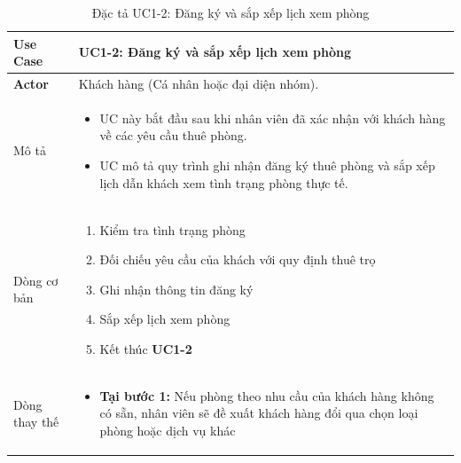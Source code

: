 \vspace{0.5cm}
\begin{table}[H]
    \centering
\begin{tabularx}{\textwidth}{|>{\centering\arraybackslash\bfseries}m{3.5cm}|X|}
    \hline
    Use Case & {\centering\textbf{UC1-2: Đăng ký và sắp xếp lịch xem phòng}\par} \\ 
    \hline
     
    Actor & Khách hàng (Cá nhân hoặc đại diện nhóm). \\
    \hline

    Mô tả & 
    \begin{itemize}[leftmargin=*, nosep, label=-]
        \vspace{0.2cm}
        \item UC này bắt đầu sau khi nhân viên đã xác nhận với khách hàng về các yêu cầu thuê phòng.
        \item UC mô tả quy trình ghi nhận đăng ký thuê phòng và sắp xếp lịch dẫn khách xem tình trạng phòng thực tế.
    \end{itemize} \\ 
    \hline
     
    Dòng cơ bản & 
    \begin{enumerate}[leftmargin=*, nosep]
        \vspace{0.2cm}
        \item Kiểm tra tình trạng phòng
        \item Đối chiếu yêu cầu của khách với quy định thuê trọ
        \item Ghi nhận thông tin đăng ký
        \item Sắp xếp lịch xem phòng
        \item Kết thúc \textbf{UC1-2} 
    \end{enumerate} \\ 
    \hline
     
    Dòng thay thế & 
    \begin{itemize}[leftmargin=*, nosep, label=-]
        \vspace{0.2cm}
        \item \textbf{Tại bước 1:} Nếu phòng theo nhu cầu của khách hàng không có sẵn, nhân viên sẽ đề xuất khách hàng đổi qua chọn loại phòng hoặc dịch vụ khác
    \end{itemize} \\ 
    \hline
\end{tabularx}
\caption{Đặc tả UC1-2: Đăng ký và sắp xếp lịch xem phòng}
\end{table}

